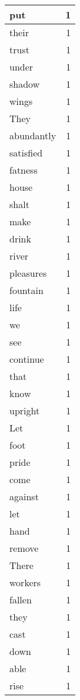 \begin{center}
\begin{longtable}{l|r}
put & 1 \\ \hline
their & 1 \\ \hline
trust & 1 \\ \hline
under & 1 \\ \hline
shadow & 1 \\ \hline
wings & 1 \\ \hline
They & 1 \\ \hline
abundantly & 1 \\ \hline
satisfied & 1 \\ \hline
fatness & 1 \\ \hline
house & 1 \\ \hline
shalt & 1 \\ \hline
make & 1 \\ \hline
drink & 1 \\ \hline
river & 1 \\ \hline
pleasures & 1 \\ \hline
fountain & 1 \\ \hline
life & 1 \\ \hline
we & 1 \\ \hline
see & 1 \\ \hline
continue & 1 \\ \hline
that & 1 \\ \hline
know & 1 \\ \hline
upright & 1 \\ \hline
Let & 1 \\ \hline
foot & 1 \\ \hline
pride & 1 \\ \hline
come & 1 \\ \hline
against & 1 \\ \hline
let & 1 \\ \hline
hand & 1 \\ \hline
remove & 1 \\ \hline
There & 1 \\ \hline
workers & 1 \\ \hline
fallen & 1 \\ \hline
they & 1 \\ \hline
cast & 1 \\ \hline
down & 1 \\ \hline
able & 1 \\ \hline
rise & 1 \\ \hline
\end{longtable}
\end{center}



\normalsize



